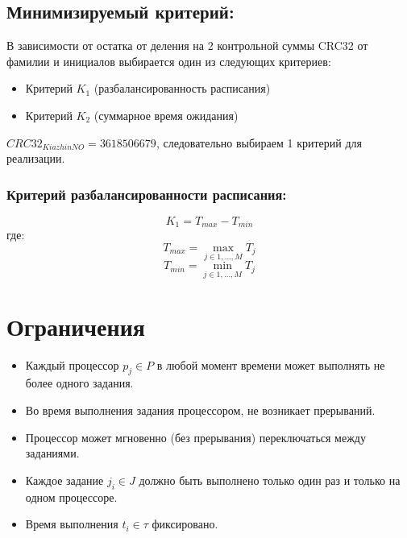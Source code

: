 \documentclass{article}
\begin{document}
        \subsection*{Минимизируемый критерий:}
            В зависимости от остатка от деления на 2 контрольной суммы CRC32 от фамилии и инициалов выбирается один из следующих критериев:
            \begin{itemize}
                \item Критерий $K_1$ (разбалансированность расписания)
                \item Критерий $K_2$ (суммарное время ожидания)
            \end{itemize}
            
            $CRC32_{KiazhinNO} = 3618506679$, следовательно выбираем 1 критерий для реализации.

            \subsubsection*{Критерий разбалансированности расписания:}

            \begin{equation}
                K_1 = T_{max} - T_{min}
            \end{equation}
            где:
            \begin{equation}
                T_{max}= \max_{j \in {1, \dots, M}}T_j
            \end{equation}
            \begin{equation}
                T_{min} = \min_{j \in {1, \dots, M}}T_j
            \end{equation}
    \section*{Ограничения}

        \begin{itemize}
            \item Каждый процессор $p_j \in P$ в любой момент времени может выполнять не более одного задания.
            \item Во время выполнения задания процессором, не возникает прерываний.
            \item Процессор может мгновенно (без прерывания) переключаться между заданиями.
            \item Каждое задание $j_i \in J$ должно быть выполнено только один раз и только на одном процессоре.
            \item Время выполнения $t_i \in \tau$ фиксировано.
        \end{itemize}
\end{document}
